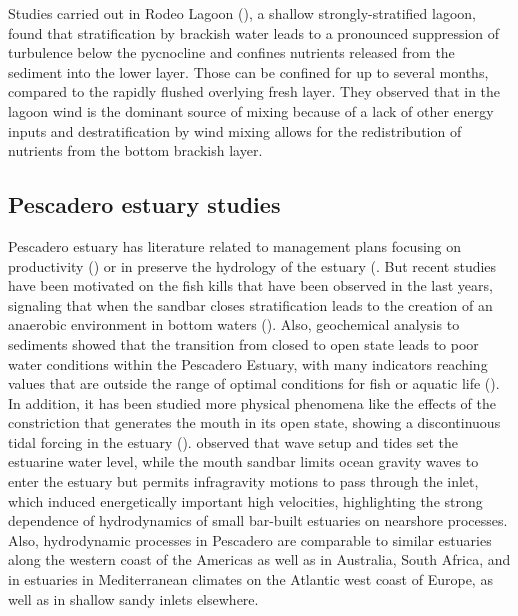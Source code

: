 \documentclass[11pt,letterpaper]{article}
\begin{document}
Studies carried out in Rodeo Lagoon (\cite{Cousins2010}), a shallow strongly-stratified lagoon, found that stratification by brackish water leads to a pronounced suppression of turbulence below the pycnocline and confines nutrients released from the sediment into the lower layer. Those can be confined for up to several months, compared to the rapidly flushed overlying fresh layer. They observed that in the lagoon wind is the dominant source of mixing because of a lack of other energy inputs and destratification by wind mixing allows for the redistribution of nutrients from the bottom brackish layer.\\

\subsection{Pescadero estuary studies}

Pescadero estuary has literature related to management plans focusing on productivity (\cite{curry1985pescadero}) or in preserve the hydrology of the estuary (\cite{williams1990pescadero}. But recent studies have been motivated on the fish kills that have been observed in the last years, signaling that when the sandbar closes stratification leads to the creation of an anaerobic environment in bottom waters (\cite{sloan2006ecological}). Also, geochemical analysis to sediments showed that the transition from closed to open state leads to poor water conditions within the Pescadero Estuary, with many indicators reaching values that are outside the range of optimal conditions for fish or aquatic life (\cite{richards2018}). \\

In addition, it has been studied more physical phenomena like the effects of the constriction that generates the mouth in its open state, showing a discontinuous tidal forcing in the estuary (\cite{williams2016}). \citeauthor{williams2016} observed that wave setup and tides set the estuarine water level, while the mouth sandbar limits ocean gravity waves to enter the estuary but permits infragravity motions to pass through the inlet, which induced energetically important high velocities, highlighting the strong dependence of hydrodynamics of small bar-built estuaries on nearshore processes. Also, hydrodynamic processes in Pescadero are comparable to similar estuaries along the western coast of the Americas as well as in Australia, South Africa, and in estuaries in Mediterranean climates on the Atlantic west coast of Europe, as well as in shallow sandy inlets elsewhere.\\
\end{document}
